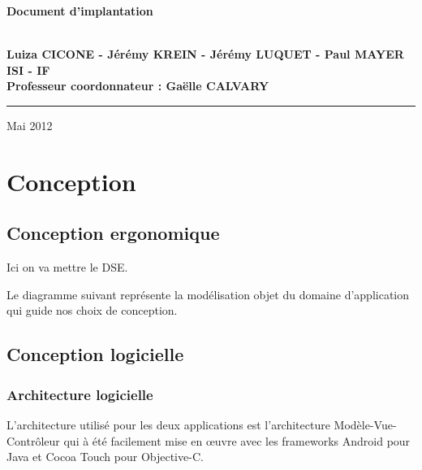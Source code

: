 \documentclass[a4paper, 11px]{article}
\begin{document}
\begin{titlepage}
\begin{center}
\begin{center}
{\Huge \bf Document d'implantation}


\end{center}


\vspace{1cm}

\begin{center}
$ $\\
\large{ \textbf{Luiza CICONE - Jérémy KREIN - Jérémy LUQUET - Paul MAYER}}\\
\large{ \textbf{ISI - IF}}\\
\large{ \textbf{Professeur coordonnateur : Gaëlle CALVARY}}
$ $\\
\end{center}
\rule{\linewidth}{.5pt}


\vfill


{\large Mai 2012}

\end{center}
\end{titlepage}

\tableofcontents

\newpage
\section {Conception}
\subsection{Conception ergonomique}

	Ici on va mettre le DSE.

Le diagramme suivant représente la modélisation objet du domaine d'application qui guide nos choix de conception.

\subsection{Conception logicielle}
\subsubsection{Architecture logicielle}
L'architecture utilisé pour les deux applications est l'architecture Modèle-Vue-Contrôleur qui à été facilement mise en œuvre avec les frameworks Android pour Java et Cocoa Touch pour Objective-C.
\end{document}
